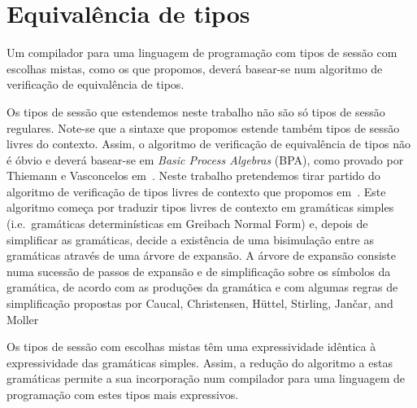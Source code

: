 \section{Equivalência de tipos}

Um compilador para uma linguagem de programação com
tipos de sessão com escolhas mistas,
como os que propomos, deverá basear-se num algoritmo de 
verificação de equivalência de tipos. 

Os tipos de sessão que estendemos
neste trabalho não são só tipos de sessão regulares.
Note-se que a sintaxe que propomos estende também
tipos de sessão livres do contexto.
Assim, o algoritmo de verificação de equivalência de tipos 
não é óbvio e deverá basear-se em \emph{Basic Process Algebras}
(BPA), como provado por Thiemann e Vasconcelos em~\cite{ref-cfst}.
Neste trabalho pretendemos tirar partido do algoritmo de verificação
de tipos livres de contexto que propomos em~\cite{type-equiv}.
Este algoritmo começa por traduzir tipos livres de contexto
em gramáticas simples (i.e.\ gramáticas determinísticas
em Greibach Normal Form) e, depois de simplificar as 
gramáticas, decide a existência de uma bisimulação entre as gramáticas
através de uma árvore de expansão. 
A árvore de expansão consiste numa
sucessão de passos de expansão e de simplificação 
sobre os símbolos da gramática, de acordo com 
as produções da gramática e com algumas regras de simplificação
propostas por Caucal, Christensen,
H\"uttel, Stirling, Jan\v car, and Moller
~\cite{caucal1986decidabilite,DBLP:journals/iandc/ChristensenHS95,janvcar1999techniques}

Os tipos de sessão com escolhas mistas têm
uma expressividade idêntica à expressividade das gramáticas
simples. Assim, a redução do algoritmo a estas gramáticas
permite a sua incorporação num compilador
para uma linguagem de programação com estes tipos mais expressivos.

